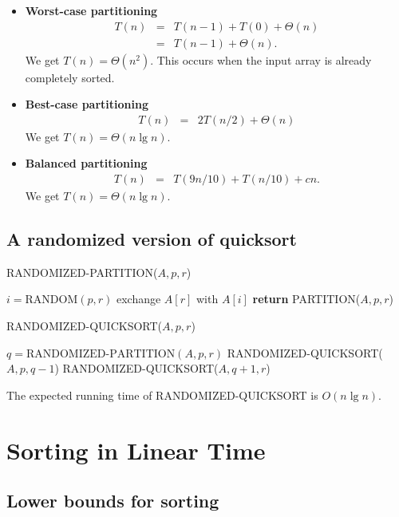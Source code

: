 \documentclass[12pt]{article}
\begin{document}
\begin{itemize}
  \item \textbf{Worst-case partitioning}
    \begin{eqnarray*}
      T(n)
      &=& T(n-1) + T(0) + \Theta(n) \\
      &=& T(n-1) + \Theta(n).
    \end{eqnarray*}
    We get $T(n) = \Theta (n^2)$. This occurs when the input array is already completely sorted.
  \item \textbf {Best-case partitioning}
    \begin{eqnarray*}
      T(n)
      &=& 2T(n/2) + \Theta(n)
    \end{eqnarray*}
    We get $T(n) = \Theta (n \lg n)$.
  \item \textbf {Balanced partitioning}
    \begin{eqnarray*}
      T(n)
      &=& T(9n/10) + T(n/10) + cn.
    \end{eqnarray*}    
    We get $T(n) = \Theta (n \lg n)$.
\end{itemize}

\subsection{A randomized version of quicksort}

RANDOMIZED-PARTITION($A, p, r$)
\begin{algorithmic}[1]
\State $i = \text{RANDOM}(p,r)$
\State exchange $A[r]$ with $A[i]$
\State \textbf{return } PARTITION($A, p, r$)
\end{algorithmic}

RANDOMIZED-QUICKSORT($A, p, r$)
\begin{algorithmic}[1]
	\State $q = \text {RANDOMIZED-PARTITION}(A, p, r)$
        \State RANDOMIZED-QUICKSORT($A, p, q-1$)
        \State RANDOMIZED-QUICKSORT($A, q+1, r$)
\EndIf
\end{algorithmic}

The expected running time of RANDOMIZED-QUICKSORT is $O(n \lg n)$.

\section{Sorting in Linear Time}

\subsection{Lower bounds for sorting}
\end{document}
